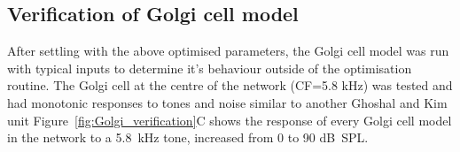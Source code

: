 
\subsection{Verification of Golgi cell model \label{sec:Golgi:verif-golgi-cell}}


After settling with the above optimised parameters, the Golgi cell model was run with typical inputs to determine it's behaviour outside of the optimisation routine.
The Golgi cell at the centre of the network (CF=5.8 kHz) was tested and had monotonic responses to tones and noise similar to another Ghoshal and Kim unit Figure~\ref{fig:Golgi_verification}C shows the response of every Golgi cell model in the network to a 5.8~kHz tone, increased from 0 to 90 dB~{SPL}.


